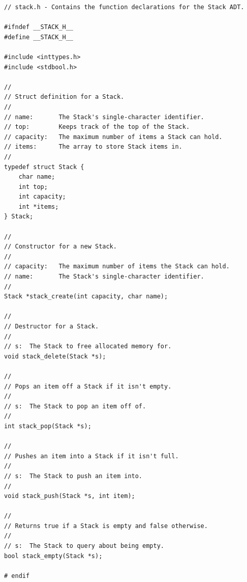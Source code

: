 \documentclass[11pt]{article}
\begin{document}
\begin{lstlisting}[title=stack.h]
// stack.h - Contains the function declarations for the Stack ADT.

#ifndef __STACK_H__
#define __STACK_H__

#include <inttypes.h>
#include <stdbool.h>

//
// Struct definition for a Stack.
//
// name:       The Stack's single-character identifier.
// top:        Keeps track of the top of the Stack.
// capacity:   The maximum number of items a Stack can hold.
// items:      The array to store Stack items in.
//
typedef struct Stack {
    char name;
    int top;
    int capacity;
    int *items;
} Stack;

//
// Constructor for a new Stack.
//
// capacity:   The maximum number of items the Stack can hold.
// name:       The Stack's single-character identifier.
//
Stack *stack_create(int capacity, char name);

//
// Destructor for a Stack.
//
// s:  The Stack to free allocated memory for.
void stack_delete(Stack *s);

//
// Pops an item off a Stack if it isn't empty.
//
// s:  The Stack to pop an item off of.
//
int stack_pop(Stack *s);

//
// Pushes an item into a Stack if it isn't full.
//
// s:  The Stack to push an item into.
//
void stack_push(Stack *s, int item);

//
// Returns true if a Stack is empty and false otherwise.
//
// s:  The Stack to query about being empty.
bool stack_empty(Stack *s);

# endif
\end{lstlisting}


\end{document}
